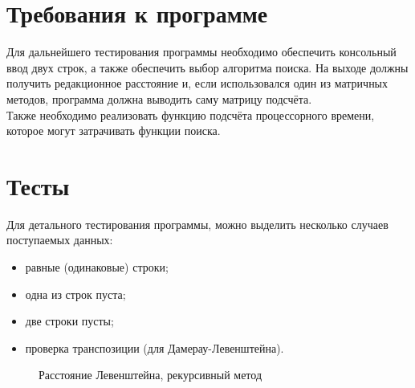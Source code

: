 \documentclass[12pt,a4paper]{report}
\begin{document}
\section{Требования к программе}

Для дальнейшего тестирования программы необходимо обеспечить консольный ввод двух строк, а также
обеспечить выбор алгоритма поиска. На выходе должны получить редакционное расстояние и, если 
использовался один из матричных методов, программа должна выводить саму матрицу подсчёта.\\

Также необходимо реализовать функцию подсчёта процессорного времени, которое могут затрачивать 
функции поиска.

\section{Тесты}

Для детального тестирования программы, можно выделить несколько случаев поступаемых данных:
\begin{itemize}
    \item равные (одинаковые) строки;
    \item одна из строк пуста;
    \item две строки пусты;
    \item проверка транспозиции (для Дамерау-Левенштейна).
\end{itemize}

\begin{figure}[h]
\caption{Расстояние Левенштейна, рекурсивный метод}
\label{fig:image}
\end{figure}
\end{document}
